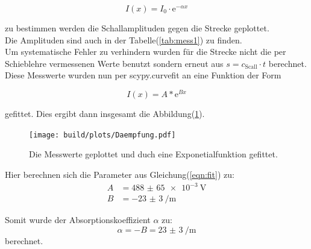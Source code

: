         \begin{equation*}
            I(x) = I_0 \cdot \text{e}^{-\alpha x}
        \end{equation*}

        \noindent zu bestimmen werden die Schallamplituden gegen die Strecke geplottet.\\
        Die Amplituden sind auch in der 
        Tabelle(\ref{tab:mess1}) zu finden.\\ 
        Um systematische Fehler zu verhindern wurden für die Strecke nicht die per Schieblehre vermessenen 
        Werte benutzt sondern erneut aus $s = c_{\text{Scall}}\cdot t$ berechnet. Diese Messwerte wurden nun per scypy.curvefit \cite{scipy}
        an eine Funktion der Form

        \begin{equation*}
            I(x) = A * \text{e}^{B x}
            \label{eqn:fit}
        \end{equation*}

        \noindent gefittet. Dies ergibt dann insgesamt die Abbildung(\ref{img:py_daem}).

        \begin{figure}[ht]
            \centering
            \texttt{[image: build/plots/Daempfung.pdf]}
            \caption{Die Messwerte geplottet und duch eine Exponetialfunktion gefittet.}
            \label{img:py_daem}
        \end{figure}

        \noindent Hier berechnen sich die Parameter aus Gleichung(\ref{eqn:fit}) zu: 
        \begin{align*}
            A &= \SI{488(65)e-3}{\volt} \\
            B &= \SI{-23(3)}{\per\metre}    
        \end{align*}

        
        \noindent Somit wurde der Absorptionskoeffizient $\alpha$ zu:\\
        \begin{equation*}
            \alpha = -B = \SI{23(3)}{\per\metre}
        \end{equation*} 
        berechnet.

